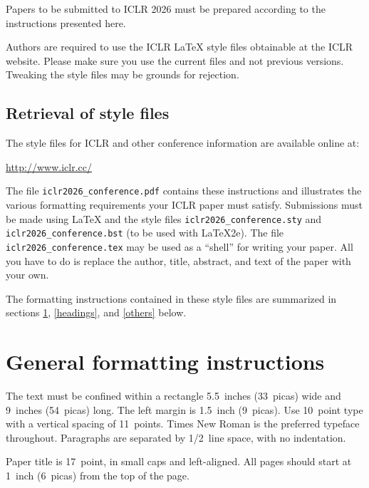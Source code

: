 \documentclass{article} %
\begin{document}
Papers to be submitted to ICLR 2026 must be prepared according to the
instructions presented here.


Authors are required to use the ICLR \LaTeX{} style files obtainable at the
ICLR website. Please make sure you use the current files and
not previous versions. Tweaking the style files may be grounds for rejection.

\subsection{Retrieval of style files}

The style files for ICLR and other conference information are available online at:
\begin{center}
   \url{http://www.iclr.cc/}
\end{center}
The file \verb+iclr2026_conference.pdf+ contains these
instructions and illustrates the
various formatting requirements your ICLR paper must satisfy.
Submissions must be made using \LaTeX{} and the style files
\verb+iclr2026_conference.sty+ and \verb+iclr2026_conference.bst+ (to be used with \LaTeX{}2e). The file
\verb+iclr2026_conference.tex+ may be used as a ``shell'' for writing your paper. All you
have to do is replace the author, title, abstract, and text of the paper with
your own.

The formatting instructions contained in these style files are summarized in
sections \ref{gen_inst}, \ref{headings}, and \ref{others} below.

\section{General formatting instructions}
\label{gen_inst}

The text must be confined within a rectangle 5.5~inches (33~picas) wide and
9~inches (54~picas) long. The left margin is 1.5~inch (9~picas).
Use 10~point type with a vertical spacing of 11~points. Times New Roman is the
preferred typeface throughout. Paragraphs are separated by 1/2~line space,
with no indentation.

Paper title is 17~point, in small caps and left-aligned.
All pages should start at 1~inch (6~picas) from the top of the page.
\end{document}
